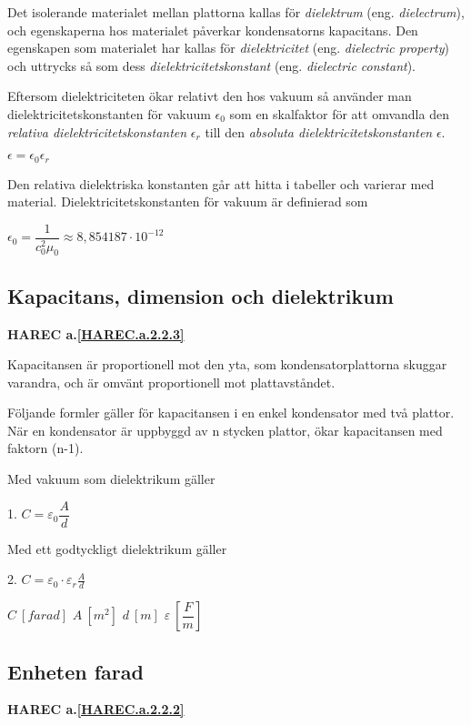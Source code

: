 Det isolerande materialet mellan plattorna kallas för \emph{dielektrum}
(eng. \emph{dielectrum}), och egenskaperna hos materialet påverkar
kondensatorns kapacitans.
Den egenskapen som materialet har kallas för \emph{dielektricitet}
(eng. \emph{dielectric property}) och uttrycks så som dess
\emph{dielektricitetskonstant} (eng. \emph{dielectric constant}).

Eftersom dielektriciteten ökar relativt den hos vakuum så använder man
dielektricitetskonstanten för vakuum \(\epsilon_0\) som en skalfaktor för att
omvandla den \emph{relativa dielektricitetskonstanten} \(\epsilon_r\) till den
\emph{absoluta dielektricitetskonstanten} \(\epsilon\).

\(\epsilon = \epsilon_0\epsilon_r\)

Den relativa dielektriska konstanten går att hitta i tabeller och varierar
med material. Dielektricitetskonstanten för vakuum är definierad som

\(\epsilon_0 = \dfrac{1}{c_0^2\mu_0} \approx 8,854187 \cdot 10^{-12}\)

\subsection{Kapacitans, dimension och dielektrikum}
\textbf{HAREC a.\ref{HAREC.a.2.2.3}\label{myHAREC.a.2.2.3}}

Kapacitansen är proportionell mot den yta, som kondensatorplattorna skuggar
varandra, och är omvänt proportionell mot plattavståndet.

Följande formler gäller för kapacitansen i en enkel kondensator med två
plattor. När en kondensator är uppbyggd av n stycken plattor, ökar kapacitansen
med faktorn (n-1).

Med vakuum som dielektrikum gäller

1. \(C = \varepsilon _0 \dfrac{A}{d}\)

Med ett godtyckligt dielektrikum gäller

2. \(C = \varepsilon _0 \cdot \varepsilon _r \frac{A}{d}\)

\(C\ [farad]\) \(A\ [m^2]\) \(d\ [m]\) \(\varepsilon\ [\dfrac{F}{m}]\)

\subsection{Enheten farad}
\textbf{HAREC a.\ref{HAREC.a.2.2.2}\label{myHAREC.a.2.2.2}}

